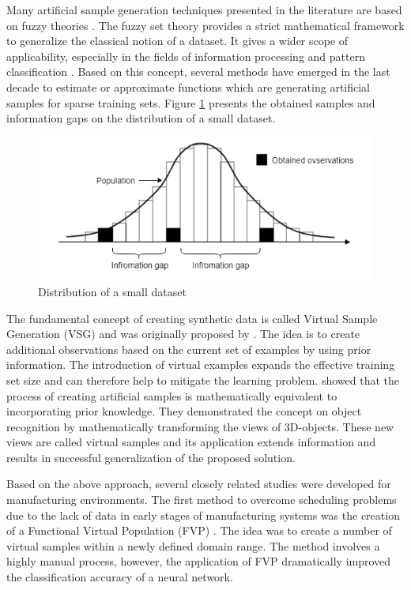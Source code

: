 \documentclass[parskip=full]{scrartcl}
\begin{document}
Many artificial sample generation techniques presented in the literature are
based on fuzzy theories \cite{AbdulLateh.2017}. The fuzzy set theory provides a
strict mathematical framework to generalize the classical notion of a dataset.
It gives a wider scope of applicability, especially in the fields of information
processing and pattern classification \cite{Zimmermann.2010}. Based on this
concept, several methods have emerged in the last decade to estimate or
approximate functions which are generating artificial samples for sparse
training sets. Figure \ref{fig:small-data-distribution} presents the obtained
samples and information gaps on the distribution of a small dataset.

\begin{figure}[H]
	\centering
	\includegraphics[width=0.6\linewidth]{../analysis/small_data_distribution.png}
	\caption{Distribution of a small dataset \cite{Tsai.2015}}
	\label{fig:small-data-distribution}
\end{figure}

The fundamental concept of creating synthetic data is called Virtual Sample
Generation (VSG) and was originally proposed by \cite{Niyogi.1998}. The idea is
to create additional observations based on the current set of examples by using
prior information. The introduction of virtual examples expands the effective
training set size and can therefore help to mitigate the learning problem.
\cite{Niyogi.1998} showed that the process of creating artificial samples is
mathematically equivalent to incorporating prior knowledge. They demonstrated
the concept on object recognition by mathematically transforming the views of
3D-objects. These new views are called virtual samples and its application
extends information and results in successful generalization of the proposed
solution.

Based on the above approach, several closely related studies were developed for
manufacturing environments. The first method to overcome scheduling problems due
to the lack of data in early stages of manufacturing systems was the creation of
a Functional Virtual Population (FVP) \cite{Li.2003}. The idea was to create a
number of virtual samples within a newly defined domain range. The method
involves a highly manual process, however, the application of FVP dramatically
improved the classification accuracy of a neural network. 
\end{document}
